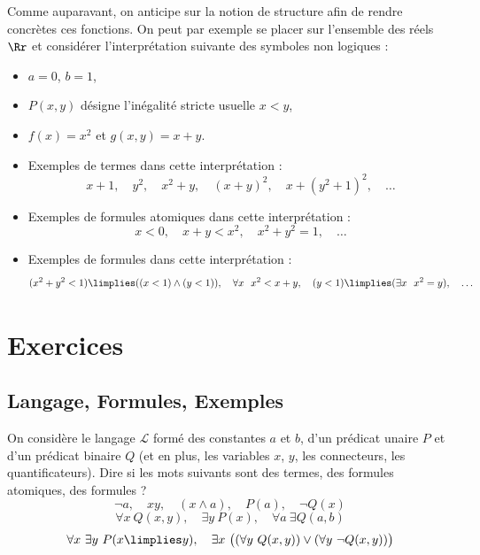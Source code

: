 \documentclass[11pt,class=report,crop=false]{standalone}
\begin{document}
Comme auparavant, on anticipe sur la notion de structure afin de rendre concrètes ces fonctions.
On peut par exemple se placer sur l'ensemble des réels $\Rr$ et considérer l'interprétation suivante des symboles non logiques :
\begin{itemize}
	\item $a=0$, $b=1$, 
	
	\item $P(x,y)$ désigne l'inégalité stricte usuelle $x< y$,
	
	\item $f(x) = x^2$ et $g(x,y)=x+y$.
\end{itemize}

\begin{itemize}
	\item Exemples de termes dans cette interprétation :
	\[
	x+1, \quad y^2, \quad x^2 + y,\quad (x+y)^2, \quad x + (y^2+1)^2,\quad \ldots
	\]
	
	
	\item Exemples de formules atomiques dans cette interprétation :
	\[
	x < 0, \quad x+y < x^2, \quad x^2+y^2 = 1, \quad\ldots
	\]
	
	\item Exemples de formules dans cette interprétation :
	\[
	(x^2+y^2 < 1) \limplies ( (x < 1)\land (y < 1) ), 
	\quad \forall x \ \  x^2 < x+y,
	\quad (y < 1) \limplies (\exists x \ \  x^2 = y), \quad \ldots
	\]	
\end{itemize}


\section*{Exercices}

\subsection*{Langage, Formules, Exemples}


\begin{exercicecours}
	On considère le langage $\mathcal{L}$ formé des constantes $a$ et $b$, d'un prédicat unaire $P$ et d'un prédicat binaire $Q$ (et en plus, les variables $x$, $y$, les connecteurs, les quantificateurs).
	Dire si les mots suivants sont des termes, des formules atomiques, des formules ?
	\[
	\lnot a, \quad xy, \quad (x \land a), \quad P(a), \quad \lnot Q(x)
	\]
	\[
	\forall x \ Q(x,y), \quad \exists y \ P(x), \quad \forall a \  \exists Q(a,b)
	\]	
	\[
	\forall x \ \exists y \ P(x \limplies y), \quad
	\exists x \ \big( (\forall y \ Q(x,y)) \lor (\forall y \ \lnot Q(x,y)) \big)
	\]
\end{exercicecours}
\end{document}
